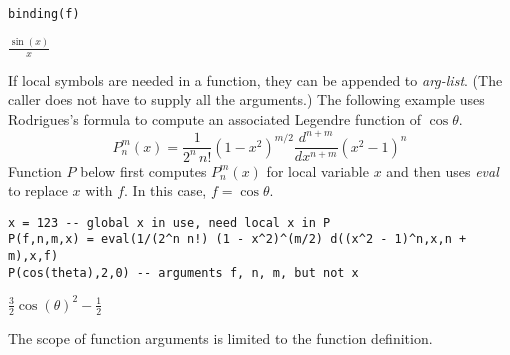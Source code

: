 \begin{Verbatim}[formatcom=\color{blue}]
binding(f)
\end{Verbatim}

\noindent
$\displaystyle \frac{\sin(x)}{x}$

\bigskip
\noindent
If local symbols are needed in a function, they can be appended to {\it arg-list}.
(The caller does not have to supply all the arguments.)
The following example uses Rodrigues's formula to
compute an associated Legendre function of $\cos\theta$.
\begin{equation*}
P_n^m(x)=\frac{1}{2^n\,n!}(1-x^2)^{m/2}\frac{d^{n+m}}{dx^{n+m}}(x^2-1)^n
\end{equation*}
Function $P$ below first computes $P_n^m(x)$ for local variable
$x$ and then uses {\it eval} to replace $x$ with $f$.
In this case, $f=\cos\theta$.

\begin{Verbatim}[formatcom=\color{blue}]
x = 123 -- global x in use, need local x in P
P(f,n,m,x) = eval(1/(2^n n!) (1 - x^2)^(m/2) d((x^2 - 1)^n,x,n + m),x,f)
P(cos(theta),2,0) -- arguments f, n, m, but not x
\end{Verbatim}

\noindent
$\displaystyle \tfrac{3}{2} \cos(\theta)^2-\tfrac{1}{2}$

\bigskip
\noindent
The scope of function arguments is limited to the function definition.
